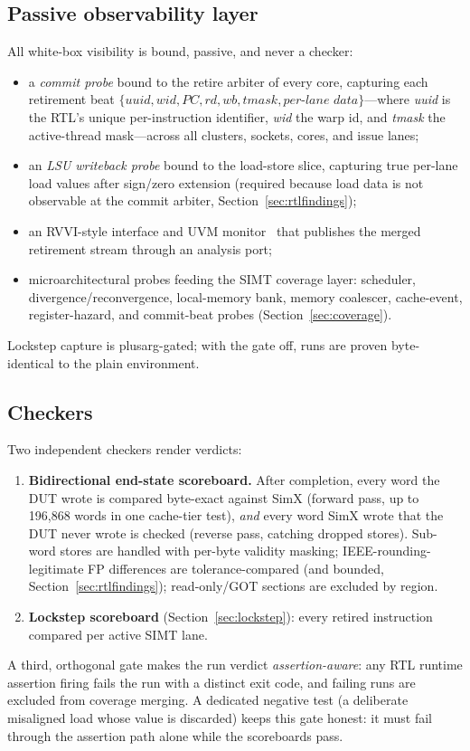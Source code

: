 \documentclass[conference]{IEEEtran}
\begin{document}
\subsection{Passive observability layer}
All white-box visibility is bound, passive, and never a checker:
\begin{itemize}
	\item a \emph{commit probe} bound to the retire arbiter of every core,
	      capturing each retirement beat
	      $\{\textit{uuid}, \textit{wid}, \textit{PC}, \textit{rd},
		      \textit{wb}, \textit{tmask}, \textit{per-lane data}\}$---where
	      \textit{uuid} is the RTL's unique per-instruction identifier,
	      \textit{wid} the warp id, and \textit{tmask} the active-thread
	      mask---across all clusters, sockets, cores, and issue lanes;
	\item an \emph{LSU writeback probe} bound to the load-store slice,
	      capturing true per-lane load values after sign/zero extension (required
	      because load data is not observable at the commit arbiter,
	      Section~\ref{sec:rtlfindings});
	\item an RVVI-style interface and UVM monitor~\cite{rvvi} that publishes
	      the merged retirement stream through an analysis port;
	\item microarchitectural probes feeding the SIMT coverage layer:
	      scheduler, divergence/reconvergence, local-memory bank, memory
	      coalescer, cache-event, register-hazard, and commit-beat probes
	      (Section~\ref{sec:coverage}).
\end{itemize}
Lockstep capture is plusarg-gated; with the gate off, runs are proven
byte-identical to the plain environment.

\subsection{Checkers}
Two independent checkers render verdicts:
\begin{enumerate}
	\item \textbf{Bidirectional end-state scoreboard.} After completion,
	      every word the DUT wrote is compared byte-exact against SimX (forward
	      pass, up to 196{,}868 words in one cache-tier test), \emph{and} every
	      word SimX wrote that the DUT never wrote is checked (reverse pass,
	      catching dropped stores). Sub-word stores are handled with per-byte
	      validity masking; IEEE-rounding-legitimate FP differences are
	      tolerance-compared (and bounded, Section~\ref{sec:rtlfindings});
	      read-only/GOT sections are excluded by region.
	\item \textbf{Lockstep scoreboard} (Section~\ref{sec:lockstep}): every
	      retired instruction compared per active SIMT lane.
\end{enumerate}
A third, orthogonal gate makes the run verdict
\emph{assertion-aware}: any RTL runtime assertion firing fails the run
with a distinct exit code, and failing runs are excluded from coverage
merging. A dedicated negative test (a deliberate misaligned load whose
value is discarded) keeps this gate honest: it must fail through the
assertion path alone while the scoreboards pass.
\end{document}
